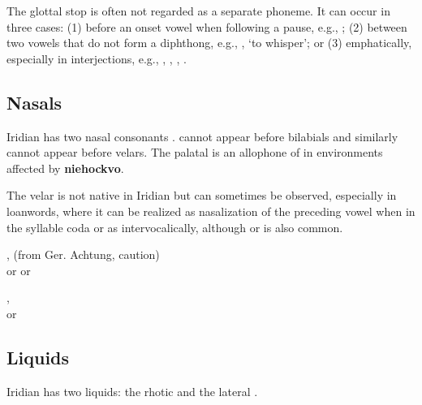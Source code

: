 \par The glottal stop \textipa{[P]} is often not regarded as a separate phoneme.
It can occur in three cases: (1) before an onset vowel when following a pause, e.g.,   ; (2) between two vowels that do not form a diphthong, e.g.,  , `to whisper'; or (3) emphatically, especially in interjections, e.g.,  , ,  , .


\subsection{Nasals}
Iridian has two nasal consonants .  cannot appear before bilabials and similarly  cannot appear before velars. The palatal \bt{\nn} is an allophone of  in environments affected by \textbf{niehockvo}.

\xe

The velar  is not native in Iridian but can sometimes be observed, especially in loanwords, where it can be realized as nasalization of the preceding vowel when in the syllable coda or as  intervocalically, although  or  is also common.

\ex
{},  (from Ger. Achtung, caution)\\
 or  or 
\xe

\ex
{}, \\
 or 
\xe

\subsection{Liquids}

Iridian has two liquids: the rhotic  and the lateral .

